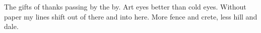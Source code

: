

The gifts of thanks passing by the by.  Art eyes better than cold
eyes.  Without paper my lines shift out of there and into here.  More
fence and crete, less hill and dale.  

\bye
